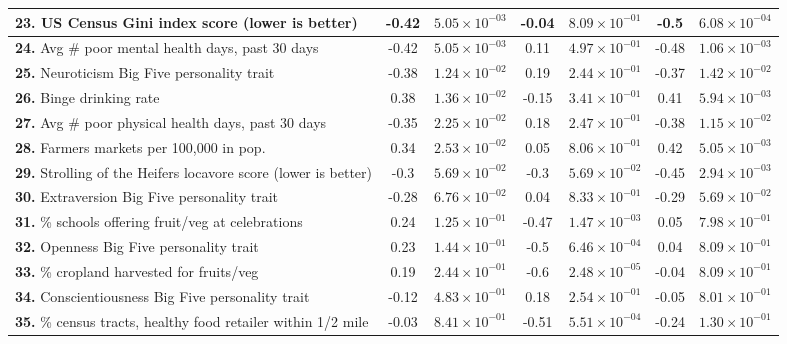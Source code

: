 \begin{table*}
\begin{longtable}{|l|c|c|c|c|c|c|}
 \textbf{23.} US Census Gini index score \cite{gini} (lower is better) & -0.42 & $5.05\times 10^{-03}$ & -0.04 & $8.09\times 10^{-01}$ & -0.5 & $6.08\times 10^{-04}$ \\\hline
 \textbf{24.} Avg \# poor mental health days, past 30 days \cite{america} & -0.42 & $5.05\times 10^{-03}$ & 0.11 & $4.97\times 10^{-01}$ & -0.48 & $1.06\times 10^{-03}$ \\\hline \hline
 \textbf{25.} Neuroticism Big Five personality trait \cite{rentfrow} & -0.38 & $1.24\times 10^{-02}$ & 0.19 & $2.44\times 10^{-01}$ & -0.37 & $1.42\times 10^{-02}$ \\\hline
 \textbf{26.} Binge drinking rate \cite{america} & 0.38 & $1.36\times 10^{-02}$ & -0.15 & $3.41\times 10^{-01}$ & 0.41 & $5.94\times 10^{-03}$ \\\hline
 \textbf{27.} Avg \# poor physical health days, past 30 days \cite{america} & -0.35 & $2.25\times 10^{-02}$ & 0.18 & $2.47\times 10^{-01}$ & -0.38 & $1.15\times 10^{-02}$ \\\hline
 \textbf{28.} Farmers markets per 100,000 in pop. \cite{produce} &
 0.34 & $2.53\times 10^{-02}$ & 0.05 & $8.06\times 10^{-01}$ & 0.42 & $5.05\times 10^{-03}$ \\\hline \hline
 \textbf{29.} Strolling of the Heifers locavore score (lower is better) \cite{stroll} & -0.3 & $5.69\times 10^{-02}$ & -0.3 & $5.69\times 10^{-02}$ & -0.45 & $2.94\times 10^{-03}$ \\\hline
 \textbf{30.} Extraversion Big Five personality trait \cite{rentfrow} & -0.28 & $6.76\times 10^{-02}$ & 0.04 & $8.33\times 10^{-01}$ & -0.29 & $5.69\times 10^{-02}$ \\\hline
 \textbf{31.} \% schools offering fruit/veg at celebrations \cite{produce} & 0.24 & $1.25\times 10^{-01}$ & -0.47 & $1.47\times 10^{-03}$ & 0.05 & $7.98\times 10^{-01}$ \\\hline
 \textbf{32.} Openness Big Five personality trait \cite{rentfrow} & 0.23 & $1.44\times 10^{-01}$ & -0.5 & $6.46\times 10^{-04}$ & 0.04 & $8.09\times 10^{-01}$ \\\hline
 \textbf{33.} \% cropland harvested for fruits/veg \cite{produce} & 0.19 & $2.44\times 10^{-01}$ & -0.6 & $2.48\times 10^{-05}$ & -0.04 & $8.09\times 10^{-01}$ \\\hline
 \textbf{34.} Conscientiousness Big Five personality trait \cite{rentfrow} & -0.12 & $4.83\times 10^{-01}$ & 0.18 & $2.54\times 10^{-01}$ & -0.05 & $8.01\times 10^{-01}$ \\\hline
 \textbf{35.} \% census tracts, healthy food retailer within 1/2 mile \cite{produce} & -0.03 & $8.41\times 10^{-01}$ & -0.51 & $5.51\times 10^{-04}$ & -0.24 & $1.30\times 10^{-01}$ \\\hline

\end{longtable}
\end{table*}

